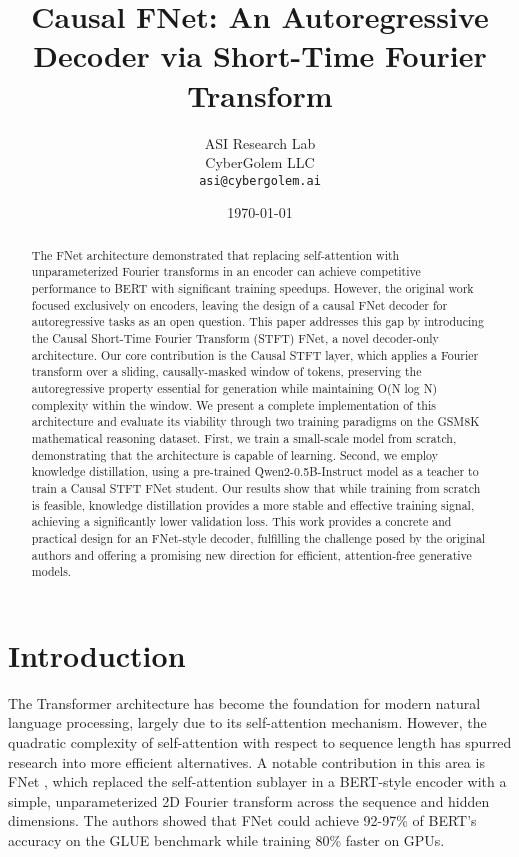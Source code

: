 \documentclass[11pt,a4paper]{article}
\title{Causal FNet: An Autoregressive Decoder via Short-Time Fourier Transform}
\author{ASI Research Lab\\
        CyberGolem LLC\\
        \texttt{asi@cybergolem.ai}}
\date{\today}
\begin{document}
\maketitle

\begin{abstract}
The FNet architecture demonstrated that replacing self-attention with unparameterized Fourier transforms in an encoder can achieve competitive performance to BERT with significant training speedups. However, the original work focused exclusively on encoders, leaving the design of a causal FNet decoder for autoregressive tasks as an open question. This paper addresses this gap by introducing the Causal Short-Time Fourier Transform (STFT) FNet, a novel decoder-only architecture. Our core contribution is the Causal STFT layer, which applies a Fourier transform over a sliding, causally-masked window of tokens, preserving the autoregressive property essential for generation while maintaining O(N log N) complexity within the window. We present a complete implementation of this architecture and evaluate its viability through two training paradigms on the GSM8K mathematical reasoning dataset. First, we train a small-scale model from scratch, demonstrating that the architecture is capable of learning. Second, we employ knowledge distillation, using a pre-trained Qwen2-0.5B-Instruct model as a teacher to train a Causal STFT FNet student. Our results show that while training from scratch is feasible, knowledge distillation provides a more stable and effective training signal, achieving a significantly lower validation loss. This work provides a concrete and practical design for an FNet-style decoder, fulfilling the challenge posed by the original authors and offering a promising new direction for efficient, attention-free generative models.
\end{abstract}

\section{Introduction}
The Transformer architecture \citep{vaswani2017attention} has become the foundation for modern natural language processing, largely due to its self-attention mechanism. However, the quadratic complexity of self-attention with respect to sequence length has spurred research into more efficient alternatives. A notable contribution in this area is FNet \citep{lee2021fnet}, which replaced the self-attention sublayer in a BERT-style encoder with a simple, unparameterized 2D Fourier transform across the sequence and hidden dimensions. The authors showed that FNet could achieve 92-97\% of BERT's accuracy on the GLUE benchmark while training 80\% faster on GPUs.
\end{document}
